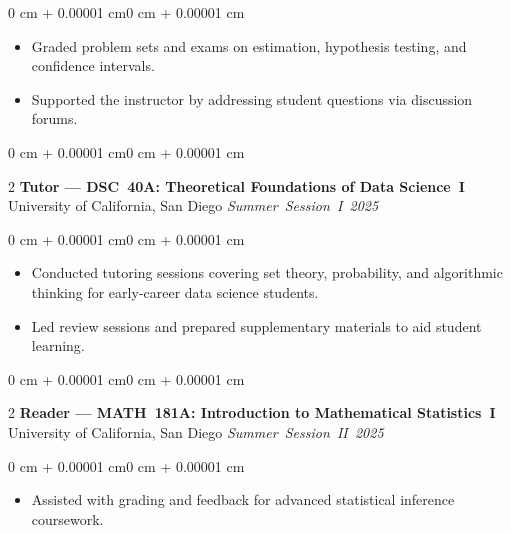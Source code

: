\documentclass[10pt, letterpaper]{article}
\newenvironment{highlights}{\begin{itemize}[topsep=0.10 cm, parsep=0.10 cm, partopsep=0pt, itemsep=0pt, leftmargin=0 cm + 10pt]}{\end{itemize}}
\newenvironment{onecolentry}{\begin{adjustwidth}{0 cm + 0.00001 cm}{0 cm + 0.00001 cm}}{\end{adjustwidth}}
\newenvironment{twocolentry}[2][]{\onecolentry \def\secondColumn{#2} \setcolumnwidth{\fill, 4.5 cm} \begin{paracol}{2}}{\switchcolumn \raggedleft \secondColumn \end{paracol} \endonecolentry}
\begin{document}
    \vspace{0.10 cm}
    \begin{onecolentry}
        \begin{highlights}
            \item Graded problem sets and exams on estimation, hypothesis testing, and confidence intervals.
            \item Supported the instructor by addressing student questions via discussion forums.
        \end{highlights}
    \end{onecolentry}

    \vspace{0.15 cm}

    \begin{twocolentry}{\textit{Summer Session I 2025}}
        \textbf{Tutor — DSC 40A: Theoretical Foundations of Data Science I}\newline
        University of California, San Diego
    \end{twocolentry}

    \vspace{0.10 cm}
    \begin{onecolentry}
        \begin{highlights}
            \item Conducted tutoring sessions covering set theory, probability, and algorithmic thinking for early‑career data science students.
            \item Led review sessions and prepared supplementary materials to aid student learning.
        \end{highlights}
    \end{onecolentry}

    \vspace{0.15 cm}

    \begin{twocolentry}{\textit{Summer Session II 2025}}
        \textbf{Reader — MATH 181A: Introduction to Mathematical Statistics I}\newline
        University of California, San Diego
    \end{twocolentry}

    \vspace{0.10 cm}
    \begin{onecolentry}
        \begin{highlights}
            \item Assisted with grading and feedback for advanced statistical inference coursework.
        \end{highlights}
    \end{onecolentry}
\end{document}
